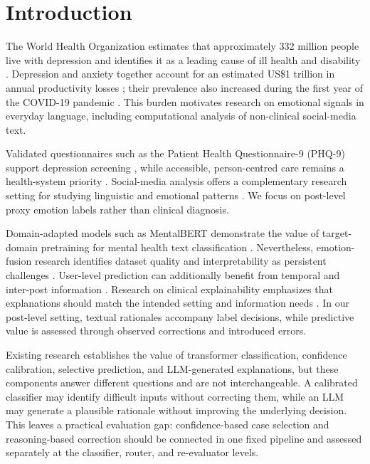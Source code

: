 \documentclass{ieeeaccess}
\begin{document}
\titlepgskip=-21pt
\maketitle
\raggedbottom

\section{Introduction}

The World Health Organization estimates that approximately 332 million people live with depression \cite{ref1} and identifies it as a leading cause of ill health and disability \cite{ref2}. Depression and anxiety together account for an estimated US\$1 trillion in annual productivity losses \cite{ref3}; their prevalence also increased during the first year of the COVID-19 pandemic \cite{ref4}. This burden motivates research on emotional signals in everyday language, including computational analysis of non-clinical social-media text.

Validated questionnaires such as the Patient Health Questionnaire-9 (PHQ-9) support depression screening \cite{ref5}, while accessible, person-centred care remains a health-system priority \cite{ref6}. Social-media analysis offers a complementary research setting for studying linguistic and emotional patterns \cite{ref7}. We focus on post-level proxy emotion labels rather than clinical diagnosis.

Domain-adapted models such as MentalBERT demonstrate the value of target-domain pretraining for mental health text classification \cite{ref8}. Nevertheless, emotion-fusion research identifies dataset quality and interpretability as persistent challenges \cite{ref9}. User-level prediction can additionally benefit from temporal and inter-post information \cite{ref10}. Research on clinical explainability emphasizes that explanations should match the intended setting and information needs \cite{ref11}. In our post-level setting, textual rationales accompany label decisions, while predictive value is assessed through observed corrections and introduced errors.

Existing research establishes the value of transformer classification, confidence calibration, selective prediction, and LLM-generated explanations, but these components answer different questions and are not interchangeable. A calibrated classifier may identify difficult inputs without correcting them, while an LLM may generate a plausible rationale without improving the underlying decision. This leaves a practical evaluation gap: confidence-based case selection and reasoning-based correction should be connected in one fixed pipeline and assessed separately at the classifier, router, and re-evaluator levels.
\end{document}
